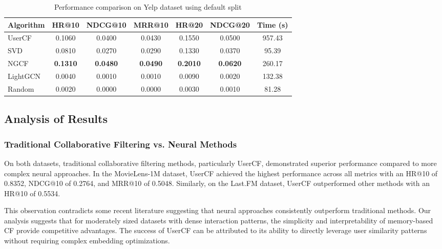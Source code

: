 \documentclass[sigconf,nonacm]{acmart} %
\begin{document}
\begin{table}[h]  
\caption{Performance comparison on Yelp dataset using default split}  
\label{tab:yelp}  
\centering  
\scriptsize  
\begin{tabular}{lcccccc}  
\hline  
\textbf{Algorithm} & \textbf{HR@10} & \textbf{NDCG@10} & \textbf{MRR@10} & \textbf{HR@20} & \textbf{NDCG@20} & \textbf{Time (s)} \\
\hline  
UserCF & 0.1060 & 0.0400 & 0.0430 & 0.1550 & 0.0500 & 957.43 \\
SVD & 0.0810 & 0.0270 & 0.0290 & 0.1330 & 0.0370 & 95.39 \\
NGCF & \textbf{0.1310} & \textbf{0.0480} & \textbf{0.0490} & \textbf{0.2010} & \textbf{0.0620} & 260.17 \\
LightGCN & 0.0040 & 0.0010 & 0.0010 & 0.0090 & 0.0020 & 132.38 \\
Random & 0.0020 & 0.0000 & 0.0000 & 0.0030 & 0.0010 & 81.28 \\
\hline  
\end{tabular}  
\end{table}  


\vspace{6cm}
\subsection{Analysis of Results}  

\subsubsection{Traditional Collaborative Filtering vs. Neural Methods}  

On both datasets, traditional collaborative filtering methods, particularly UserCF, demonstrated superior performance compared to more complex neural approaches. In the MovieLens-1M dataset, UserCF achieved the highest performance across all metrics with an HR@10 of 0.8352, NDCG@10 of 0.2764, and MRR@10 of 0.5048. Similarly, on the Last.FM dataset, UserCF outperformed other methods with an HR@10 of 0.5534.  

This observation contradicts some recent literature suggesting that neural approaches consistently outperform traditional methods. Our analysis suggests that for moderately sized datasets with dense interaction patterns, the simplicity and interpretability of memory-based CF provide competitive advantages. The success of UserCF can be attributed to its ability to directly leverage user similarity patterns without requiring complex embedding optimizations.  
\end{document}
